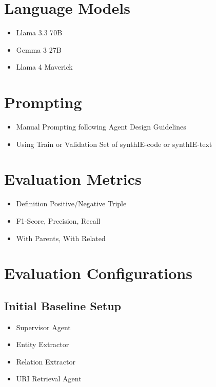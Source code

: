 \documentclass[a4paper,oneside,bibliography=totoc]{scrbook}
\begin{document}
\section{Language Models}
\label{sec:eval_language_models}
\begin{itemize}
  \item Llama 3.3 70B
  \item Gemma 3 27B
  \item Llama 4 Maverick
\end{itemize}
\section{Prompting}
\label{sec:prompting}
\begin{itemize}
  \item Manual Prompting following Agent Design Guidelines
  \item Using Train or Validation Set of synthIE-code or synthIE-text
\end{itemize}
\section{Evaluation Metrics}
\label{sec:evaluation_metrics}
\begin{itemize}
  \item Definition Positive/Negative Triple \cite{Josifoski2021}
  \item F1-Score, Precision, Recall
  \item With Parents, With Related
\end{itemize}


\section{Evaluation Configurations}
\label{sec:evaluation_configurations}
\subsection{Initial Baseline Setup}
\label{subsec:initial_baseline_setup}
\begin{itemize}
  \item Supervisor Agent
  \item Entity Extractor
  \item Relation Extractor
  \item URI Retrieval Agent
\end{itemize}
\end{document}
